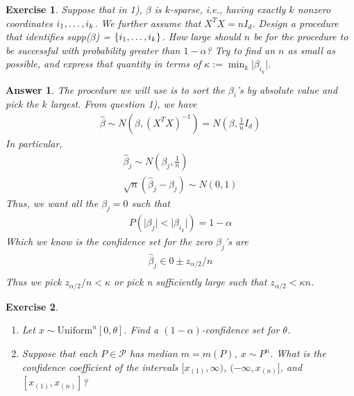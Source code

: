 \documentclass[12pt]{article}
\theoremstyle{colon}
\newtheorem{exercise}{Exercise}
\newtheorem*{answer}{Answer}
\begin{document}
\clearpage

\begin{exercise}
   Suppose that in 1), $\beta$ is $k$-sparse, i.e., having exactly $k$ nonzero coordinates $i_1,\mathellipsis,i_k$. We further assume that $X^T X = n I_d$. Design a procedure that identifies supp($\beta$) = $\{ i_1,\mathellipsis,i_k \}$. How large should $n$ be for the procedure to be successful with probability greater than $1-\alpha$? Try to find an $n$ as small as possible, and express that quantity in terms of $\kappa := \min_k \lvert \beta_{i_k} \rvert$.
\end{exercise}

\begin{answer}
  The procedure we will use is to sort the $\beta_i$'s by absolute value and pick the $k$ largest. From question 1), we have
  \begin{gather*}
    \widehat{\beta} \sim N(\beta, (X^T X)^{-1}) = N(\beta, \frac{1}{n} I_d)
  \end{gather*}
  In particular,
  \begin{gather*}
    \widehat{\beta}_j \sim N(\beta_j, \frac{1}{n}) \\
    \sqrt{n} (\widehat{\beta}_j - \beta_j) \sim N(0, 1)
  \end{gather*}
  Thus, we want all the $\beta_j = 0$ such that
  \begin{gather*}
    P( \lvert \beta_j \rvert < \lvert \beta_{i_k} \rvert) = 1 - \alpha
  \end{gather*}
  Which we know is the confidence set for the zero $\beta_j$'s are
  \begin{gather*}
    \widehat{\beta}_j \in 0 \pm z_{\alpha/2}/n \\
  \end{gather*}
  Thus we pick $z_{\alpha/2}/n < \kappa$ or pick n sufficiently large such that $z_{\alpha/2} < \kappa n$.
\end{answer}

\clearpage

\begin{exercise}
  \leavevmode
  \begin{enumerate}[label=\arabic*)]
    \item Let $x \sim \text{Uniform}^n [0,  \theta]$. Find a $(1-\alpha)$-confidence set for $\theta$.
    \item Suppose that each $P \in \mathcal{P}$ has median $m = m(P)$, $x \sim P^n$. What is the confidence coefficient of the intervals $[x_{(1)}, \infty)$, $(-\infty, x_{(n)}]$, and $[x_{(1)}, x_{(n)}]$?
  \end{enumerate}
\end{exercise}
\end{document}
